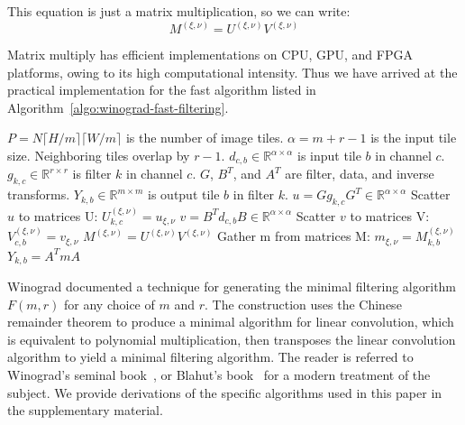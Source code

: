 \documentclass[10pt,twocolumn,letterpaper]{article}
\begin{document}
This equation is just a matrix multiplication, so we can write:
\begin{equation}\label{eq:fastconvnet_transformdims_individual}
M^{(\xi,\nu)} = U^{(\xi,\nu)} V^{(\xi,\nu)}
\end{equation}

Matrix multiply has efficient implementations on CPU, GPU, and FPGA platforms, owing to its high computational intensity. Thus we have arrived at the practical implementation for the fast algorithm listed in Algorithm~\ref{algo:winograd-fast-filtering}.

\begin{algorithm}
  \caption{Compute Convnet Layer with Winograd Minimal Filtering Algorithm $F(m\times m, r \times r)$}
  \begin{algorithmic}
    \Statex $P=N\lceil H/m \rceil\lceil W/m \rceil$ is the number of image tiles.
    \Statex $\alpha=m+r-1$ is the input tile size.
    \Statex Neighboring tiles overlap by $r-1$.
    \Statex $d_{c,b} \in \mathbb{R}^{\alpha\times \alpha}$ is input tile $b$ in channel $c$.
    \Statex $g_{k,c} \in \mathbb{R}^{r\times r}$ is filter $k$ in channel $c$.
    \Statex $G$, $B^T$, and $A^T$ are filter, data, and inverse transforms.
    \Statex $Y_{k,b} \in \mathbb{R}^{m\times m}$ is output tile $b$ in filter $k$.
    \State        $u = Gg_{k,c}G^T \in \mathbb{R}^{\alpha\times \alpha}$ 
    \State Scatter $u$ to matrices U: $U^{(\xi,\nu)}_{k,c}=u_{\xi,\nu}$
    \EndFor
    \EndFor
	\State        $v = B^Td_{c,b}B \in \mathbb{R}^{\alpha\times \alpha} $
    \State Scatter $v$ to matrices V: $V^{(\xi,\nu)}_{c,b}=v_{\xi,\nu}$
    \EndFor 
    \EndFor
	\State $M^{(\xi,\nu)} = U^{(\xi,\nu)} V^{(\xi,\nu)}$
	\EndFor
    \EndFor
    \State Gather m from matrices M: $m_{\xi,\nu} = M^{(\xi,\nu)}_{k,b}$
	\State      $Y_{k,b} = A^T m A $
	\EndFor
    \EndFor
\end{algorithmic}
\label{algo:winograd-fast-filtering}
\end{algorithm}

Winograd documented a technique for generating the minimal filtering algorithm $F(m,r)$ for any choice of $m$ and $r$. The construction uses the Chinese remainder theorem to produce a minimal algorithm for linear convolution, which is equivalent to polynomial multiplication, then transposes the linear convolution algorithm to yield a minimal filtering algorithm. The reader is referred to Winograd's seminal book~\cite{winograd1980arithmetic}, or Blahut's book~\cite{blahut2010fast} for a modern treatment of the subject. We provide derivations of the specific algorithms used in this paper in the supplementary material.
\end{document}
